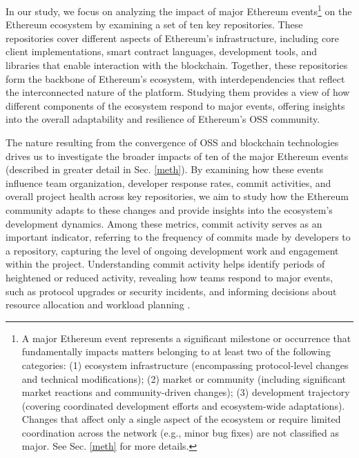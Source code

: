 In our study, we focus on analyzing the impact of major Ethereum events\footnote{A major Ethereum event represents a significant milestone or occurrence that fundamentally impacts matters belonging to at least two of the following categories: (1) ecosystem infrastructure (encompassing protocol-level changes and technical modifications); (2) market or community (including significant market reactions and community-driven changes); (3) development trajectory (covering coordinated development efforts and ecosystem-wide adaptations). Changes that affect only a single aspect of the ecosystem or require limited coordination across the network (e.g., minor bug fixes) are not classified as major. See Sec. \ref{meth} for more details.} on the Ethereum ecosystem by examining a set of ten key repositories. These repositories cover different aspects of Ethereum’s infrastructure, including core client implementations, smart contract languages, development tools, and libraries that enable interaction with the blockchain. Together, these repositories form the backbone of Ethereum's ecosystem, with interdependencies that reflect the interconnected nature of the platform. Studying them provides a view of how different components of the ecosystem respond to major events, offering insights into the overall adaptability and resilience of Ethereum's OSS community.

The nature resulting from the convergence of OSS and blockchain technologies drives us to investigate the broader impacts of ten of the major Ethereum events (described in greater detail in Sec. \ref{meth}).
By examining how these events influence team organization, developer response rates, commit activities\cite{Soto2017Analyzing}, and overall project health across key repositories, we aim to study how the Ethereum community adapts to these changes and provide insights into the ecosystem’s development dynamics\cite{Wang2019Unveiling}.
Among these metrics, commit activity serves as an important indicator, referring to the frequency of commits made by developers to a repository, capturing the level of ongoing development work and engagement within the project. 
Understanding commit activity helps identify periods of heightened or reduced activity, revealing how teams respond to major events, such as protocol upgrades or security incidents, and informing decisions about resource allocation and workload planning \cite{10.1145/3510003.3510205}.

